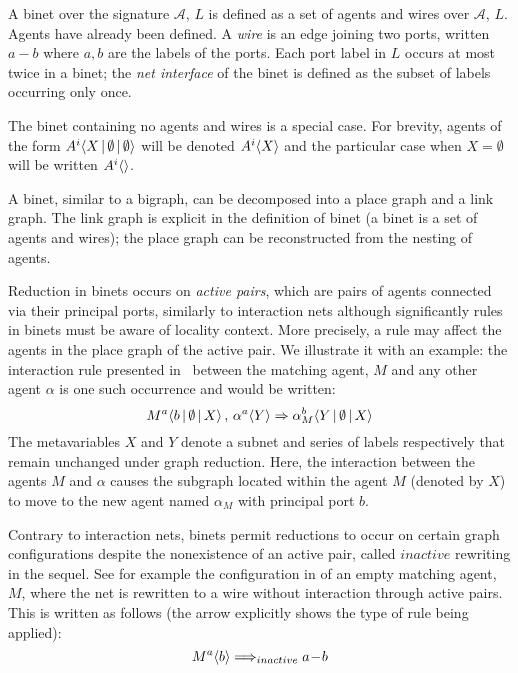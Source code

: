 \documentclass[copyright,creativecommons]{eptcs}
\begin{document}
\begin{definition}[Binet]
A binet over the signature $\mathcal{A}$, $L$ is defined as a set of
agents and wires over $\mathcal{A}$, $L$. Agents have already been
defined. A \emph{wire} is an edge joining two ports, written $a\!-\!b$
where $a,b$ are the labels of the ports.  Each port label in $L$
occurs at most twice in a binet; the \emph{net interface} of the binet
is defined as the subset of labels occurring only once.

The binet containing no
agents and wires is a special case.  For brevity, agents of the form
$A^{i} \langle X \,|\, \emptyset \,|\, \emptyset \rangle$ will be denoted
$A^{i} \langle X \rangle$ and the particular case when $X = \emptyset$
will be written $A^{i} \langle \rangle$.
\end{definition}

 A binet, similar to a bigraph, can be decomposed into a place
graph and a link graph. The link graph is explicit in the definition of
binet (a binet is a set of agents and wires); the place graph can 
be reconstructed from the nesting of agents.

Reduction in binets occurs on \emph{active pairs}, which are pairs of
agents connected via their principal ports, similarly to interaction
nets although significantly rules in binets must be aware of locality
context. More precisely, a rule may affect the agents in the place
graph of the active pair.  We illustrate it with an example:
the interaction rule presented in~\cite{EXPRESS} between the matching agent,
 $M$ and any other agent $\alpha$
is one such occurrence and would be written:
$$M^{a} \langle b \,|\, \emptyset \,|\, X \rangle
\, , \,\alpha^{a} \langle Y \rangle \Rightarrow \alpha_M^{b} \langle Y \,|\, \emptyset \,|\, X \rangle$$
The metavariables $X$ and $Y$ denote a subnet and series of labels respectively
that remain unchanged under graph reduction.  Here, the interaction between the
agents $M$ and $\alpha$ causes the subgraph located within the agent $M$ (denoted by $X$) to 
move to the new agent named $\alpha_M$ with principal port $b$.

Contrary to interaction nets, binets permit reductions to occur on certain 
graph configurations despite the nonexistence of an active pair, called 
$inactive$ rewriting in the sequel. See for example the 
configuration in \cite{EXPRESS} of an empty matching agent, $M$, where the net is rewritten to a wire without interaction through active pairs.
This is written as follows (the arrow explicitly shows the type 
of rule being applied):
$$M^{a} \langle b \rangle \Longrightarrow_{inactive} a\!-\!b$$
\end{document}

